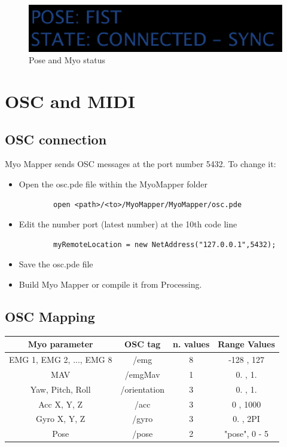 \documentclass[12pt,a4paper]{article}
\begin{document}
	\begin{figure}[h]
		\centering
		\includegraphics[width=0.6\linewidth]{../images/MyoMapper-Pose-Status}
		\caption{Pose and Myo status}
		\label{fig:MyoMapper-Pose-Status}
	\end{figure}	
		 
\section{OSC and MIDI}
	\subsection{OSC connection}
	
	Myo Mapper sends OSC messages at the port number 5432. To change it:
	
	\begin{itemize}
	\item  Open the osc.pde file within the MyoMapper folder
		\begin{verbatim}
		open <path>/<to>/MyoMapper/MyoMapper/osc.pde
		\end{verbatim}
	\item Edit the number port (latest number) at the 10th code line
		\begin{verbatim}
	    myRemoteLocation = new NetAddress("127.0.0.1",5432);
	    \end{verbatim}
	\item Save the osc.pde file
	\item Build Myo Mapper or compile it from Processing.
    \end{itemize}
	\subsection{OSC Mapping}
	
	\begin{tabular}{|c|c|c|c|}\hline
		\textbf{Myo parameter}   & \textbf{OSC tag} & \textbf{n. values} & \textbf{Range Values} \\ \hline
		EMG 1, EMG 2, ..., EMG 8 &  /emg        & 8         &  -128 , 127  \\ \hline
		MAV                      & /emgMav      & 1         & 0. , 1.      \\\hline 
		Yaw, Pitch, Roll         & /orientation	& 3         & 0. , 1.      \\ \hline
		Acc X, Y, Z              & /acc         & 3         & 0 , 1000     \\ \hline
		Gyro X, Y, Z             & /gyro        & 3         & 0. , 2PI     \\ \hline
		Pose                     & /pose         & 2         & "pose", 0 - 5 \\ \hline
	\end{tabular} \\ \ \\
	
\end{document}
